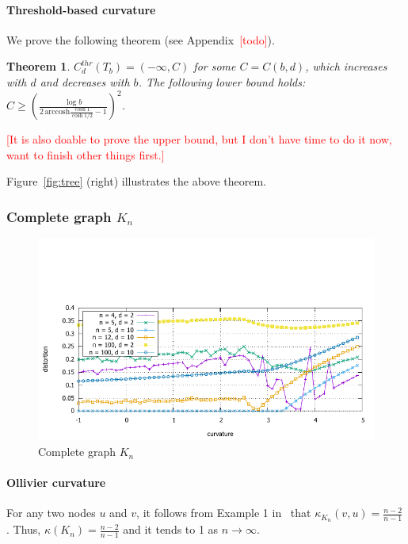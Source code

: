 \documentclass{article} %
\newtheorem{theorem}{Theorem}[section]
\begin{document}
\paragraph{Threshold-based curvature} 

We prove the following theorem (see Appendix~\textcolor{red}{[todo]}).

\begin{theorem}\label{thm:tree_threshold}
$C_d^{thr}(T_b) = (-\infty, C)$ for some $C = C(b,d)$, which increases with $d$ and decreases with $b$. 
The following lower bound holds: $C \ge \left( \frac{\log b}{2 \, \mathrm{arccosh} \frac{\cosh 1}{\cosh 1/2} - 1} \right)^2$.
\end{theorem}

\textcolor{red}{[It is also doable to prove the upper bound, but I don't have time to do it now, want to finish other things first.]}

Figure~\ref{fig:tree} (right) illustrates the above theorem.

\subsubsection{Complete graph $K_n$}

\begin{figure}
    \centering
    \includegraphics[width = 0.8 \textwidth]{clique_distortion.pdf}
    \caption{Complete graph $K_n$}
    \label{fig:clique}
\end{figure}

\paragraph{Ollivier curvature}  
For any two nodes $u$ and $v$, it follows from Example 1 in~\citep{jost2014ollivier} that $\kappa_{K_n}(v, u) = \frac{n-2}{n-1}$. Thus, $\kappa(K_n) = \frac{n-2}{n-1}$ and it tends to 1 as $n \to \infty$.
\end{document}
